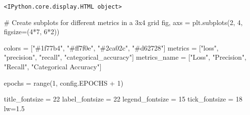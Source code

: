 \documentclass[
  letterpaper,
  DIV=11,
  numbers=noendperiod]{scrreprt}
\newenvironment{Shaded}{\begin{snugshade}}{\end{snugshade}}
\newcommand{\BuiltInTok}[1]{\textcolor[rgb]{0.00,0.23,0.31}{#1}}
\newcommand{\CommentTok}[1]{\textcolor[rgb]{0.37,0.37,0.37}{#1}}
\newcommand{\DecValTok}[1]{\textcolor[rgb]{0.68,0.00,0.00}{#1}}
\newcommand{\FloatTok}[1]{\textcolor[rgb]{0.68,0.00,0.00}{#1}}
\newcommand{\NormalTok}[1]{\textcolor[rgb]{0.00,0.23,0.31}{#1}}
\newcommand{\OperatorTok}[1]{\textcolor[rgb]{0.37,0.37,0.37}{#1}}
\newcommand{\StringTok}[1]{\textcolor[rgb]{0.13,0.47,0.30}{#1}}
\begin{document}
\begin{verbatim}
<IPython.core.display.HTML object>
\end{verbatim}

\begin{Shaded}
\begin{Highlighting}[]
\CommentTok{\# Create subplots for different metrics in a 3x4 grid}
\NormalTok{fig, axs }\OperatorTok{=}\NormalTok{ plt.subplots(}\DecValTok{2}\NormalTok{, }\DecValTok{4}\NormalTok{, figsize}\OperatorTok{=}\NormalTok{(}\DecValTok{4}\OperatorTok{*}\DecValTok{7}\NormalTok{, }\DecValTok{6}\OperatorTok{*}\DecValTok{2}\NormalTok{))}

\NormalTok{colors }\OperatorTok{=}\NormalTok{ [}\StringTok{"\#1f77b4"}\NormalTok{, }\StringTok{"\#ff7f0e"}\NormalTok{, }\StringTok{"\#2ca02c"}\NormalTok{, }\StringTok{"\#d62728"}\NormalTok{]}
\NormalTok{metrics }\OperatorTok{=}\NormalTok{ [}\StringTok{"loss"}\NormalTok{, }\StringTok{"precision"}\NormalTok{, }\StringTok{"recall"}\NormalTok{, }\StringTok{"categorical\_accuracy"}\NormalTok{]}
\NormalTok{metrics\_name }\OperatorTok{=}\NormalTok{ [}\StringTok{"Loss"}\NormalTok{, }\StringTok{"Precision"}\NormalTok{, }\StringTok{"Recall"}\NormalTok{, }\StringTok{"Categorical Accuracy"}\NormalTok{]}

\NormalTok{epochs }\OperatorTok{=} \BuiltInTok{range}\NormalTok{(}\DecValTok{1}\NormalTok{, config.EPOCHS }\OperatorTok{+} \DecValTok{1}\NormalTok{)}

\NormalTok{title\_fontsize }\OperatorTok{=} \DecValTok{22}
\NormalTok{label\_fontsize }\OperatorTok{=} \DecValTok{22}
\NormalTok{legend\_fontsize }\OperatorTok{=} \DecValTok{15}
\NormalTok{tick\_fontsize }\OperatorTok{=} \DecValTok{18}
\NormalTok{lw}\OperatorTok{=}\FloatTok{1.5}


\end{Highlighting}
\end{Shaded}
\end{document}
